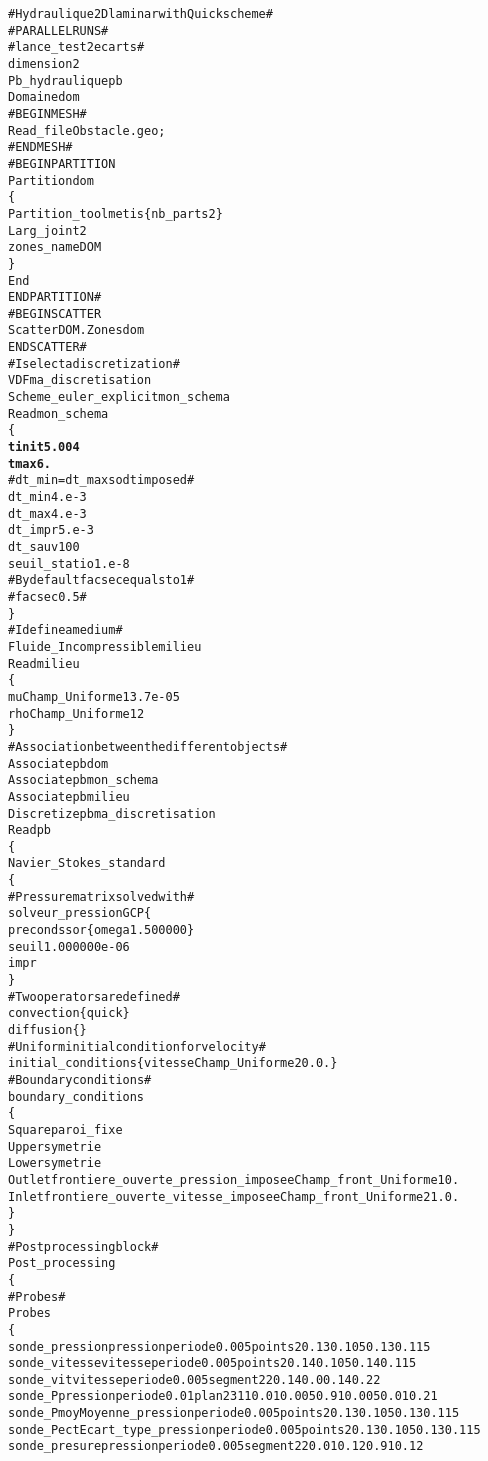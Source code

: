 \begin{alltt}
# Hydraulique 2D laminar with Quick scheme #
# PARALLEL RUNS # 
# lance_test 2 ecarts # 
dimension 2 
Pb_hydraulique pb 
Domaine dom 
# BEGIN MESH # 
Read_file Obstacle.geo ; 
# END MESH # 
# BEGIN PARTITION 
Partition dom 
\{ 
    Partition_tool metis \{ nb_parts 2 \} 
    Larg_joint 2 
    zones_name DOM 
\} 
End 
END PARTITION # 
# BEGIN SCATTER 
Scatter DOM.Zones dom 
END SCATTER # 
# I select a discretization # 
VDF ma_discretisation 
Scheme_euler_explicit mon_schema 
Read mon_schema 
\{ 
    {\bf{tinit 5.004}}
    {\bf{tmax  6.}}
    # dt_min=dt_max so dt imposed # 
    dt_min 4.e-3
    dt_max 4.e-3
    dt_impr 5.e-3
    dt_sauv 100 
    seuil_statio 1.e-8 
    # By default facsec equals to 1 # 
    # facsec 0.5 # 
\} 
# I define a medium # 
Fluide_Incompressible milieu 
Read milieu 
\{ 
    mu Champ_Uniforme 1 3.7e-05 
    rho Champ_Uniforme 1 2 
\} 
# Association between the different objects # 
Associate pb dom 
Associate pb mon_schema 
Associate pb milieu 
Discretize pb ma_discretisation 
Read pb 
\{ 
    Navier_Stokes_standard 
    \{ 
        # Pressure matrix solved with # 
            solveur_pression GCP \{  
            precond ssor \{ omega 1.500000 \}  
            seuil 1.000000e-06  
            impr  
        \} 
        # Two operators are defined # 
        convection \{ quick \} 
        diffusion \{ \} 
        # Uniform initial condition for velocity # 
        initial_conditions \{ vitesse Champ_Uniforme 2 0. 0. \}
        # Boundary conditions # 
        boundary_conditions 
        \{ 
            Square      paroi_fixe 
            Upper       symetrie 
            Lower       symetrie 
            Outlet      frontiere_ouverte_pression_imposee Champ_front_Uniforme 1 0. 
            Inlet       frontiere_ouverte_vitesse_imposee Champ_front_Uniforme 2 1. 0. 
        \} 
    \} 
    # Post processing block # 
    Post_processing
    \{ 
        # Probes # 
        Probes 
        \{ 
            sonde_pression  pression     periode 0.005   points 2 0.13 0.105 0.13 0.115 
            sonde_vitesse   vitesse      periode 0.005   points 2 0.14 0.105    0.14 0.115 
            sonde_vit       vitesse      periode 0.005   segment 22 0.14 0.0 0.14 0.22 
            sonde_P         pression     periode 0.01    plan 23 11 0.01 0.005 0.91 0.005 0.01 0.21 
            sonde_Pmoy      Moyenne_pression    periode 0.005   points 2 0.13 0.105 0.13 0.115 
            sonde_Pect      Ecart_type_pression periode 0.005   points 2 0.13 0.105 0.13 0.115 
            sonde_presure   pression     periode 0.005   segment 22 0.01 0.12 0.91 0.12

\end{alltt}

